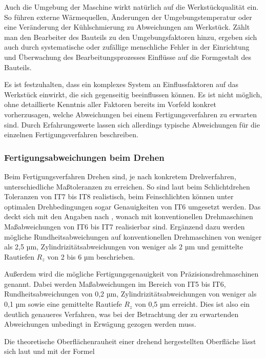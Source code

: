 Auch die Umgebung der Maschine wirkt natürlich auf die Werkstückqualität ein. So führen externe Wärmequellen, Änderungen der Umgebungstemperatur oder eine Veränderung der Kühlschmierung zu Abweichungen am Werkstück. Zählt man den Bearbeiter des Bauteils zu den Umgebungsfaktoren hinzu, ergeben sich auch durch systematische oder zufällige menschliche Fehler in der Einrichtung und Überwachung des Bearbeitungsprozesses Einflüsse auf die Formgestalt des Bauteils. 

Es ist festzuhalten, dass ein komplexes System an Einflussfaktoren auf das Werkstück einwirkt, die sich gegenseitig beeinflussen können. Es ist nicht möglich, ohne detaillierte Kenntnis aller Faktoren bereits im Vorfeld konkret vorherzusagen, welche Abweichungen bei einem Fertigungsverfahren zu erwarten sind. Durch Erfahrungswerte lassen sich allerdings typische Abweichungen für die einzelnen Fertigungsverfahren beschreiben. 

\subsubsection {Fertigungsabweichungen beim Drehen}

Beim Fertigungsverfahren Drehen sind, je nach konkretem Drehverfahren, unterschiedliche Maßtoleranzen zu erreichen. So sind laut \cite{Dietrich.2014} beim Schlichtdrehen Toleranzen von IT7 bis IT8 realistisch, beim Feinschlichten können unter optimalen Drehbedingungen sogar Genauigkeiten von IT6 umgesetzt werden. Das deckt sich mit den Angaben nach \cite{Denkena.2011}, wonach mit konventionellen Drehmaschinen Maßabweichungen von IT6 bis IT7 realisierbar sind. Ergänzend dazu werden mögliche Rundheitsabweichungen auf konventionellen Drehmaschinen von weniger als 2,5 µm, Zylindrizitätsabweichungen von weniger als 2 µm und gemittelte Rautiefen $R_{z}$ von 2 bis 6 µm beschrieben. 

Außerdem wird die mögliche Fertigungsgenauigkeit von Präzisionsdrehmaschinen genannt. Dabei werden Maßabweichungen im Bereich von IT5 bis IT6, Rundheitsabweichungen von 0,2 µm, Zylindrizitätsabweichungen von weniger als 0,1 µm sowie eine gemittelte Rautiefe $R_{z}$ von 0,5 µm erreicht. Dies ist also ein deutlich genaueres Verfahren, was bei der Betrachtung der zu erwartenden Abweichungen unbedingt in Erwägung gezogen werden muss. 

Die theoretische Oberflächenrauheit einer drehend hergestellten Oberfläche lässt sich laut \cite{Dietrich.2014} und \cite{Paucksch.2008} mit der Formel 

